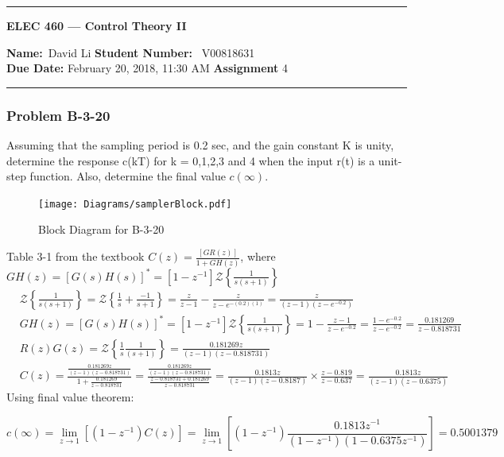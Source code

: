 
\begin{center}
	\hrule
	\vspace{.4cm}
	{\textbf { \large ELEC 460 --- Control Theory II}}
\end{center}
{\textbf{Name:}\ David Li \hspace{\fill} \textbf{Student Number:} \ V00818631  \\
{\textbf{Due Date:} February 20, 2018, 11:30 AM \hspace{\fill} \textbf{Assignment}  4}\\
\hrule

\subsubsection*{Problem B-3-20}
Assuming that the sampling period is 0.2 sec, and the gain constant K is unity, determine the response c(kT) for k = 0,1,2,3 and 4 when the input r(t) is a unit-step function. Also, determine the final value $c(\infty)$.
\begin{figure}[H]
	\centering
	\texttt{[image: Diagrams/samplerBlock.pdf]}
	\caption{Block Diagram for B-3-20}
	\label{fig:samplerblock}
\end{figure}

Table 3-1 from the textbook %
 $C(z)=\frac{[GR(z)]}{1+GH(z)}$, where $GH(z) = \left[G(s)H(s)\right]^\ast=[1-z^{-1}] \mathcal{Z} \left\{\frac{1}{s(s+1)}\right\}$
\begin{align*}
&  \mathcal{Z} \left\{\frac{1}{s(s+1)}\right\} = \mathcal{Z} \left\{\frac{1}{s}+\frac{-1}{s+1}\right\} = \frac{z}{z-1}-\frac{z}{z-e^{-(0.2)(1)}}=\frac{z}{(z-1)(z-e^{-0.2})} \\
& GH(z) = \left[G(s)H(s)\right]^\ast=[1-z^{-1}] \mathcal{Z} \left\{\frac{1}{s(s+1)}\right\} 
= 1-\frac{z-1}{z-e^{-0.2}}=\frac{1-e^{-0.2}}{z-e^{-0.2}}=\frac{0.181269}{z-0.818731} \\
& R(z)G(z)= \mathcal{Z} \left\{\frac{1}{s}\frac{1}{(s+1)}\right\} = \frac{0.181269z}{(z-1)(z-0.818731)} \\
& C(z) =\frac{\frac{0.181269z}{(z-1)(z-0.818731)}}{1+\frac{0.181269}{z-0.818731}}= \frac{\frac{0.181269z}{(z-1)(z-0.818731)}}{\frac{z-0.818731+0.181269}{z-0.818731}}= \frac{0.1813z}{(z-1)(z-0.8187)} \times \frac{z-0.819}{z-0.637}=\frac{0.1813z}{(z-1)(z-0.6375)} 
\end{align*}
Using final value theorem:

\[ c(\infty)=\lim\limits_{z\rightarrow 1} \left[ \left(1-z^{-1}\right)C(z)\right]=\lim\limits_{z\rightarrow 1} \left[ \left(1-z^{-1}\right)\frac{0.1813z^{-1}}{(1-z^{-1})(1-0.6375z^{-1})} \right]=0.5001379 \]
}

